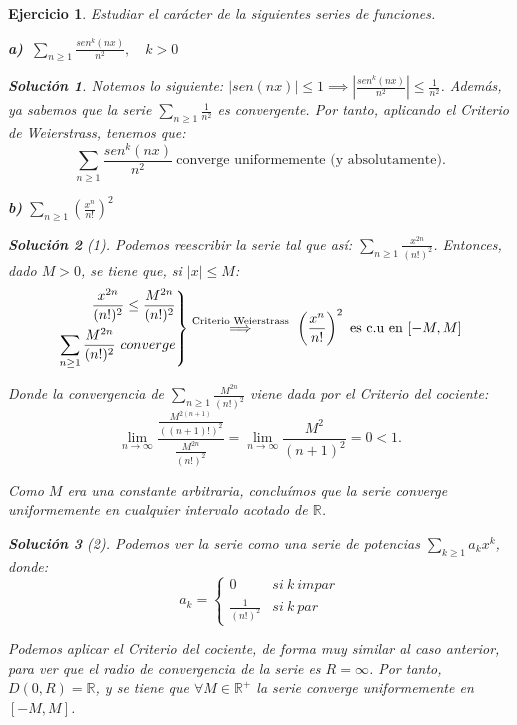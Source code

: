\documentclass[11pt, a4paper]{article}
\newcommand\ddfrac[2]{\frac{\displaystyle #1}{\displaystyle #2}}
\theoremstyle{theorem-style}
\theoremstyle{definition-style}
\newtheorem{ejer}{Ejercicio}[section]
\theoremstyle{remark-style}
\newtheorem*{sol}{Solución}
\theoremstyle{example-style}
\newenvironment{rcases}
{\left.\begin{aligned}}
    {\end{aligned}\right\rbrace}
\begin{document}
\begin{ejer}
  Estudiar el carácter de la siguientes series de funciones.

  \textbf{a)} $\ \displaystyle \sum_{n\geq1} \frac{sen^k(nx)}{n^2}, \quad k > 0$

  \begin{sol}
    Notemos lo siguiente: $\displaystyle |sen(nx)| \le 1 \implies \left|\frac{sen^k(nx)}{n^2}\right| \leq \frac{1}{n^2}$. Además, ya sabemos que la serie $\displaystyle \sum_{n \ge 1} \frac{1}{n^2}$ es convergente. Por tanto, aplicando el \textit{Criterio de Weierstrass}, tenemos que: $$\sum_{n\ge1} \frac{sen^k(nx)}{n^2}\ \text{converge uniformemente (y absolutamente).}$$
  \end{sol}

  \textbf{b)} $\displaystyle \sum_{n\geq1} \left(\frac{x^n}{n!}\right)^2$

  \begin{sol}[1] Podemos reescribir la serie tal que así: $\displaystyle \sum_{n\ge1} \frac{x^{2n}}{(n!)^2}$. Entonces, dado $M>0$, se tiene que, si $|x|\le M$:
    $$\begin{rcases}
      \frac{x^{2n}}{(n!)^2} \leq \frac{M^{2n}}{(n!)^2}\\
      \sum_{n\ge 1} \frac{M^{2n}}{(n!)^2} \ converge
    \end{rcases} \overset{\text{Criterio Weierstrass}}{\implies} \ \left(\frac{x^{n}}{n!}\right)^2 \ \text{es c.u en}\ [-M,M]$$ 
    
    Donde la convergencia de $\displaystyle \sum_{n\ge 1} \frac{M^{2n}}{(n!)^2}$ viene dada por el \textit{Criterio del cociente:} $$\lim_{n\to\infty}\ddfrac{\ddfrac{M^{2(n+1)}}{((n+1)!)^2}}{\frac{M^{2n}}{(n!)^2}} = \lim_{n\to\infty} \frac{M^2}{(n+1)^2} = 0 < 1.$$

    Como $M$ era una constante arbitraria, concluímos que la serie converge uniformemente en cualquier intervalo acotado de $\mathbb{R}$.
  \end{sol}

  \begin{sol}[2] Podemos ver la serie como una serie de potencias $\displaystyle \sum_{k \ge 1} a_kx^k$, donde: $$a_k = \begin{cases} 0 & si \ k \ impar \\ \displaystyle \frac{1}{(n!)^2} & si \ k \ par \end{cases}$$
    
    Podemos aplicar el \textit{Criterio del cociente}, de forma muy similar al caso anterior, para ver que el radio de convergencia de la serie es $R = \infty$. Por tanto, $D(0,R) = \mathbb{R}$, y se tiene que $\forall M \in \mathbb{R}^+$ la serie converge uniformemente en $[-M,M]$.
  \end{sol}



\end{ejer}
\end{document}
